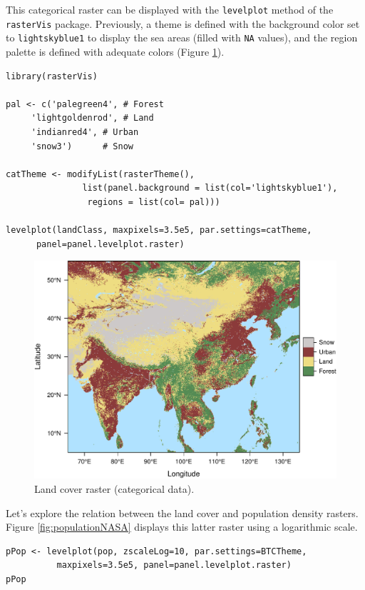 \documentclass[smallroyalvopaper]{memoir}
\begin{document}
This categorical raster can be displayed with the \texttt{levelplot} method
of the \texttt{rasterVis} package. Previously, a theme is defined with the
background color set to \texttt{lightskyblue1} to display the sea areas
(filled with \texttt{NA} values), and the region palette is defined with
adequate colors (Figure \ref{fig:landClass}).


\lstset{language=R,numbers=none}
\begin{lstlisting}
library(rasterVis)

pal <- c('palegreen4', # Forest
	 'lightgoldenrod', # Land
	 'indianred4', # Urban
	 'snow3')      # Snow

catTheme <- modifyList(rasterTheme(),
		       list(panel.background = list(col='lightskyblue1'),
			    regions = list(col= pal)))

levelplot(landClass, maxpixels=3.5e5, par.settings=catTheme,
	  panel=panel.levelplot.raster)
\end{lstlisting}

\begin{figure}[htb]
\centering
\includegraphics[width=.9\linewidth]{figs/landClass.pdf}
\caption{\label{fig:landClass}Land cover raster (categorical data).}
\end{figure}

Let's explore the relation between the land cover and population
density rasters. Figure \ref{fig:populationNASA} displays this
latter raster using a logarithmic scale.

\lstset{language=R,numbers=none}
\begin{lstlisting}
pPop <- levelplot(pop, zscaleLog=10, par.settings=BTCTheme,
		  maxpixels=3.5e5, panel=panel.levelplot.raster)
pPop
\end{lstlisting}
\end{document}
